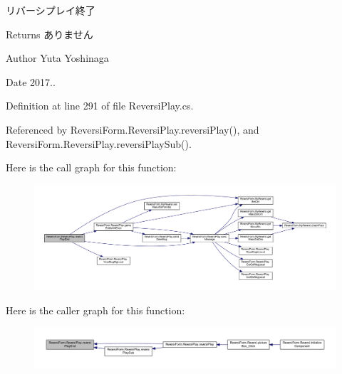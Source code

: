 リバーシプレイ終了 

\begin{DoxyReturn}{Returns}
ありません 
\end{DoxyReturn}
\begin{DoxyAuthor}{Author}
Yuta Yoshinaga 
\end{DoxyAuthor}
\begin{DoxyDate}{Date}
2017.. 
\end{DoxyDate}


Definition at line 291 of file Reversi\+Play.\+cs.



Referenced by Reversi\+Form.\+Reversi\+Play.\+reversi\+Play(), and Reversi\+Form.\+Reversi\+Play.\+reversi\+Play\+Sub().

Here is the call graph for this function\+:\nopagebreak
\begin{figure}[H]
\begin{center}
\leavevmode
\includegraphics[width=350pt]{class_reversi_form_1_1_reversi_play_abb6d68c910c7d14ff4eaa8db745f0449_cgraph}
\end{center}
\end{figure}
Here is the caller graph for this function\+:\nopagebreak
\begin{figure}[H]
\begin{center}
\leavevmode
\includegraphics[width=350pt]{class_reversi_form_1_1_reversi_play_abb6d68c910c7d14ff4eaa8db745f0449_icgraph}
\end{center}
\end{figure}
\mbox{\label{class_reversi_form_1_1_reversi_play_adcbe040514044b7cc8498c0764638356}} 

